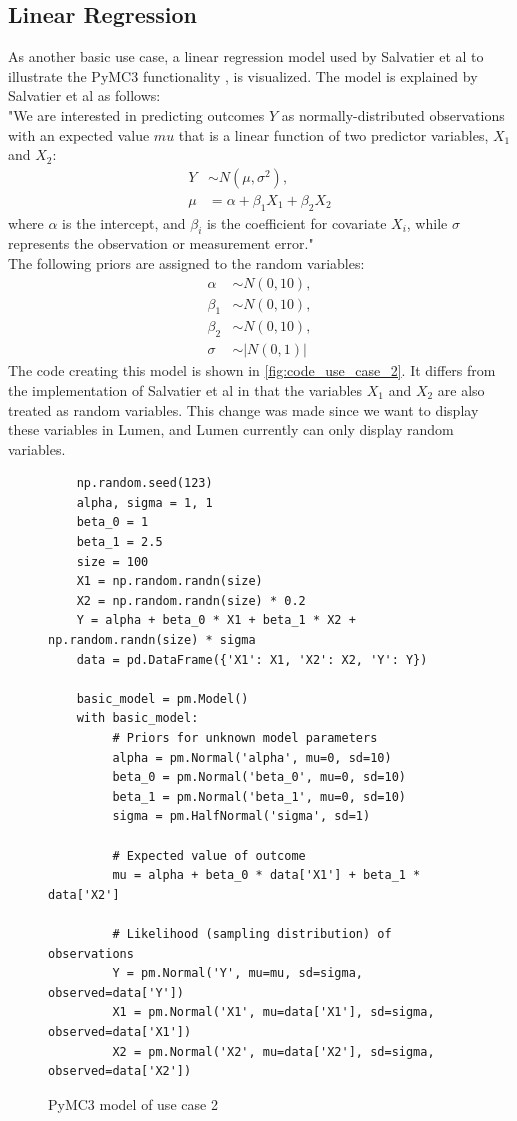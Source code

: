 \documentclass{article}
\begin{document}
\subsection{Linear Regression}
As another basic use case, a linear regression model used by Salvatier et al to illustrate the PyMC3 functionality \cite{Salvatier2016}, is visualized. 
The model is explained by Salvatier et al as follows:\\
"We are interested in predicting outcomes $Y$ as normally-distributed observations with an expected value $mu$ that is a linear function of two predictor variables, $X_1$ and $X_2$:
\begin{equation}
\begin{split}
Y &\sim N(\mu,\sigma^2), \\
\mu &= \alpha + \beta_1 X_1 + \beta_2 X_2
\end{split}
\end{equation}
where $\alpha$ is the intercept, and $\beta_i$ is the coefficient for covariate $X_i$, while $\sigma$ represents the observation or measurement error."\\
The following priors are assigned to the random variables:
\begin{equation}
\begin{split}
\alpha &\sim N(0,10), \\
\beta_1 &\sim N(0,10), \\
\beta_2 &\sim N(0,10), \\
\sigma &\sim |N(0,1)|
\end{split}
\end{equation}
The code creating this model is shown in \autoref{fig:code_use_case_2}. It differs from the implementation of Salvatier et al in that the variables $X_1$ and $X_2$ are also treated as random variables. This change was made since we want to display these variables in Lumen, and Lumen currently can only display random variables.
\begin{figure}[h]
	\begin{lstlisting}
	np.random.seed(123)
	alpha, sigma = 1, 1
	beta_0 = 1
	beta_1 = 2.5
	size = 100
	X1 = np.random.randn(size)
	X2 = np.random.randn(size) * 0.2
	Y = alpha + beta_0 * X1 + beta_1 * X2 + np.random.randn(size) * sigma
	data = pd.DataFrame({'X1': X1, 'X2': X2, 'Y': Y})
	
	basic_model = pm.Model()
	with basic_model:
	     # Priors for unknown model parameters
	     alpha = pm.Normal('alpha', mu=0, sd=10)
	     beta_0 = pm.Normal('beta_0', mu=0, sd=10)
	     beta_1 = pm.Normal('beta_1', mu=0, sd=10)
	     sigma = pm.HalfNormal('sigma', sd=1)
	
	     # Expected value of outcome
	     mu = alpha + beta_0 * data['X1'] + beta_1 * data['X2']
	
	     # Likelihood (sampling distribution) of observations
	     Y = pm.Normal('Y', mu=mu, sd=sigma, observed=data['Y'])
	     X1 = pm.Normal('X1', mu=data['X1'], sd=sigma, observed=data['X1'])
	     X2 = pm.Normal('X2', mu=data['X2'], sd=sigma, observed=data['X2'])
	\end{lstlisting}
	\caption[PyMC3 model of use case 2]{PyMC3 model of use case 2}
	\label{fig:code_use_case_2}
\end{figure}
\end{document}
